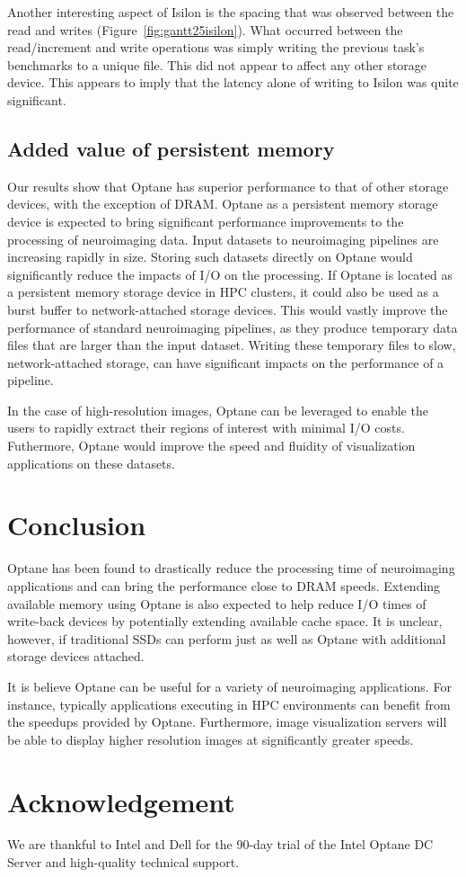 \documentclass[conference]{IEEEtran}
\begin{document}
Another interesting aspect of Isilon is the spacing that was observed between the read and writes
(Figure~\ref{fig:gantt25isilon}). What occurred between the read/increment and
write operations was simply writing the previous task's benchmarks to a unique
file. This did not appear to affect any other storage device. This appears to imply
that the latency alone of writing to Isilon was quite significant.

\subsection{Added value of persistent memory}

Our results show that Optane has superior performance to that of other storage devices, with the
exception of DRAM. Optane as a persistent memory storage device is expected to bring significant
performance improvements to the processing of neuroimaging data. Input datasets to neuroimaging pipelines
are increasing rapidly in size. Storing such datasets directly on Optane would significantly reduce the
impacts of I/O on the processing. If Optane is located as a persistent memory storage device in HPC clusters,
it could also be used as a burst buffer to network-attached storage devices. This would vastly
improve the performance of standard neuroimaging pipelines, as they produce temporary data files that 
are larger than the input dataset. Writing these temporary files to slow, network-attached storage, can have
significant impacts on the performance of a pipeline.

In the case of high-resolution images, Optane can be leveraged to enable the users to rapidly
extract their regions of interest with minimal I/O costs. Futhermore, Optane would improve the
speed and fluidity of visualization applications on these datasets.

\section{Conclusion}

Optane has been found to drastically reduce the processing time of neuroimaging applications and
can bring the performance close to DRAM speeds. Extending available memory using Optane is also 
expected to help reduce I/O times of write-back devices by potentially extending available cache space.
It is unclear, however, if traditional SSDs can perform just as well as Optane with additional storage devices
attached.

It is believe Optane can be useful for a variety of neuroimaging applications. For
instance, typically applications executing in HPC environments can benefit from 
the speedups provided by Optane. Furthermore, image visualization servers will be able
to display higher resolution images at significantly greater speeds.
\section{Acknowledgement}
We are thankful to Intel and Dell
for the 90-day trial of the Intel Optane DC Server and high-quality technical support.
 

\end{document}
